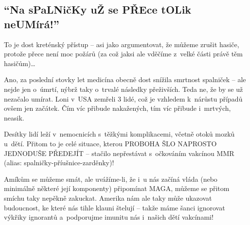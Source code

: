 \documentclass[main.tex]{subfiles}
\begin{document}
\subsection*{\enquote{Na sPaLNičKy uŽ se PŘEce tOLik neUMírá!}}
To je dost kreténský přístup – asi jako argumentovat, že můžeme zrušit hasiče, protože přece není moc požárů (za což jaksi ale vděčíme z~velké části právě těm hasičům)…\par
Ano, za poslední stovky let medicína obecně dost snížila smrtnost spalniček – ale nejde jen o~úmrtí, nýbrž taky o~trvalé následky přeživších. Teda ne, že by se už nezačalo umírat. Loni v~USA zemřeli 3 lidé, což je vzhledem k~nárůstu případů ovšem jen začátek. Čím víc přibude nakažených, tím víc přibude i~mrtvých, neasik.\par
Desítky lidí leží v~nemocnicích s~těžkými komplikacemi, včetně otoků mozků u~dětí. Přitom to je celé situace, kterou PROBOHA ŠLO NAPROSTO JEDNODUŠE PŘEDEJÍT – stačilo nepřestávat s~očkováním vakcínou MMR (alias: spalničky-příušnice-zarděnky)!\par
Amíkům se můžeme smát, ale uvážíme-li, že i~u nás začíná vláda (nebo minimálně některé její komponenty) připomínat MAGA, můžeme se přitom smíchu taky nepěkně zakuckat. Amerika nám ale taky může ukazovat budoucnost, ke které nás tihle klauni štelují – takže máme šanci ignorovat výkřiky ignorantů a~podporujme imunitu nás i~našich dětí vakcínami!
\newpage
\end{document}
